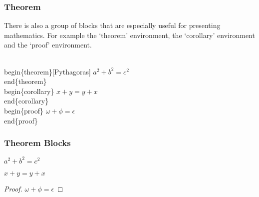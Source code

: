 \label{theoremCode}
\begin{frame}\frametitle{Theorem}
  There is also a group of blocks that are especially useful for presenting mathematics. For example the ‘theorem’ environment, the ‘corollary’ environment and the ‘proof’ environment.
  \begin{semiverbatim}
    \\begin\{theorem\}[Pythagoras] \newline
      $ a^2 + b^2 = c^2$ \newline
    \\end\{theorem\} \newline
    \\begin\{corollary\} \newline
      $ x + y = y + x  $ \newline
    \\end\{corollary\} \newline
    \\begin\{proof\} \newline
      $\omega +\phi = \epsilon $ \newline
    \\end\{proof\}
  \end{semiverbatim}
\end{frame}

\label{theoremBlocks}
\begin{frame}\frametitle{Theorem Blocks}
  \begin{theorem}[Pythagoras] 
    $ a^2 + b^2 = c^2$
  \end{theorem}
  \begin{corollary}
    $ x + y = y + x  $
  \end{corollary}
  \begin{proof}
    $\omega +\phi = \epsilon $
  \end{proof}
\end{frame}